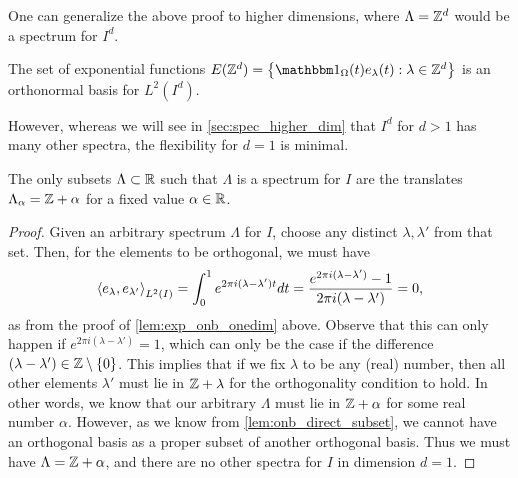 \documentclass[../thesis.tex]{subfiles}
\begin{document}
One can generalize the above proof to higher dimensions, where $\Lambda = \mathbb{Z}^d$ would be a spectrum for $I^d$.
\begin{theorem}\label{lem:z_d_in_higer_d}
    The set of exponential functions $E(\Z^d) = \braqMed{\indicator{\Omega}{t} e_\lambda(t) : \lambda \in \Z^d}$ is an orthonormal basis for $L^2(I^d)$.
\end{theorem}
However, whereas we will see in \cref{sec:spec_higher_dim} that $I^d$ for $d>1$ has many other spectra, the flexibility for $d=1$ is minimal. %
\begin{proposition}\label{prop:class_all_shift}
    The only subsets $\Lambda \subset \mathbb{R}$ such that $\Lambda$ is a spectrum for $I$ are the translates $\Lambda_\alpha = \mathbb{Z} + \alpha$ for a fixed value $\alpha \in \mathbb{R}$.
\end{proposition}
\begin{proof} %
    Given an arbitrary spectrum $\Lambda$ for $I$, choose any distinct $\lambda,\lambda'$ from that set. Then, for the elements to be orthogonal, we must have
    \begin{equation}\label{eq:zero_set_equation}
        \left \langle e_{\lambda},e_{\lambda'}  \right \rangle_{L^2(I)} = \int_0^1 e^{2 \pi i (\lambda-\lambda')t} dt =\frac{e^{2 \pi i (\lambda - \lambda')} -1}{2 \pi i (\lambda-\lambda')} = 0,
    \end{equation}
    as from the proof of \cref{lem:exp_onb_onedim} above. Observe that this can only happen if $e^{2\pi i (\lambda-\lambda')} = 1$, which can only be the case if the difference $(\lambda-\lambda') \in \mathbb{Z}\setminus\{0\}$. This implies that if we fix $\lambda$ to be any (real) number, then all other elements $\lambda'$ must lie in $\mathbb{Z} + \lambda$ for the orthogonality condition to hold. In other words, we know that our arbitrary $\Lambda$ must lie in $\mathbb{Z}+\alpha$ for some real number $\alpha$. However, as we know from \cref{lem:onb_direct_subset}, we cannot have an orthogonal basis as a proper subset of another orthogonal basis. Thus we must have $\Lambda = \mathbb{Z}+\alpha$, and there are no other spectra for $I$ in dimension $d=1$.
\end{proof} %
\end{document}
